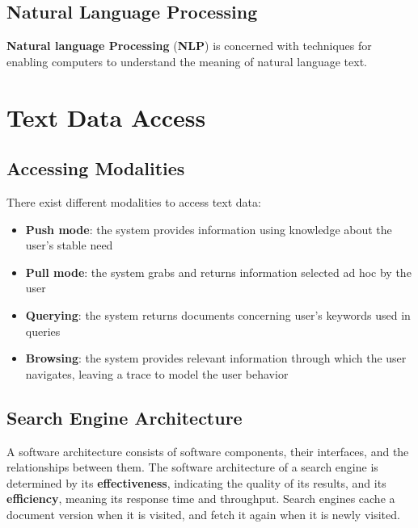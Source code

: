 \documentclass{article}
\begin{document}
\subsection{Natural Language Processing}
\textbf{Natural language Processing} (\textbf{NLP}) is concerned with techniques for enabling computers to understand the meaning of natural language text.

\newpage

\section{Text Data Access}
\subsection{Accessing Modalities}
There exist different modalities to access text data:
\begin{itemize}
    \item \textbf{Push mode}: the system provides information using knowledge about the user's stable need
    \item {\textbf{Pull mode}}: the system grabs and returns information selected ad hoc by the user
    \item {\textbf{Querying}}: the system returns documents concerning user's keywords used in queries 
    \item {\textbf{Browsing}}: the system provides relevant information through which the user navigates, leaving a trace to model the user behavior \\
\end{itemize}
\subsection{Search Engine Architecture}
A software architecture consists of software components, their interfaces, and the relationships between them.
The software architecture of a search engine is determined by its \textbf{effectiveness}, indicating the quality of its results, and its \textbf{efficiency}, meaning its response time and throughput. Search engines cache a document version when it is visited, and fetch it again when it is newly visited. \\
\end{document}
